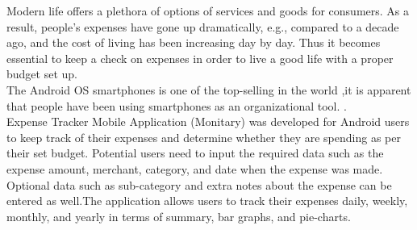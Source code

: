\begin{Large}
\end{Large}
\vskip 0.1in Modern life offers a plethora of options of services and goods for consumers. As a 
result, people’s expenses have gone up dramatically, e.g., compared to a decade ago, and the 
cost of living has been increasing day by day. Thus it becomes essential to keep a check on expenses in order to live a good life with a proper budget set up.  \\

\noindent The Android OS smartphones is one of the top-selling  in the world ,it is apparent that people have been using smartphones as an organizational tool. .\\

\noindent Expense Tracker Mobile Application (Monitary) was developed for Android users to keep track of their expenses and determine whether they are spending as per their set budget. Potential users need to input the required data such as the expense amount, merchant, category, and date when the expense was made. Optional data such as sub-category and extra notes about the expense can be entered as well.The application allows users to track their expenses daily, weekly, monthly, and yearly in terms of summary, bar graphs, and pie-charts. 